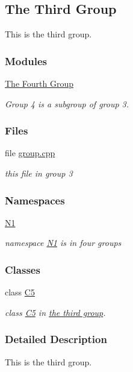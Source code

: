 \hypertarget{group__group3}{}\subsection{The Third Group}
\label{group__group3}


This is the third group.  


\subsubsection*{Modules}
\begin{DoxyCompactItemize}
\item 
\hyperlink{group__group4}{The Fourth Group}
\begin{DoxyCompactList}\small\item\em Group 4 is a subgroup of group 3. \end{DoxyCompactList}\end{DoxyCompactItemize}
\subsubsection*{Files}
\begin{DoxyCompactItemize}
\item 
file \hyperlink{group_8cpp}{group.\+cpp}
\begin{DoxyCompactList}\small\item\em this file in group 3 \end{DoxyCompactList}\end{DoxyCompactItemize}
\subsubsection*{Namespaces}
\begin{DoxyCompactItemize}
\item 
 \hyperlink{namespace_n1}{N1}
\begin{DoxyCompactList}\small\item\em namespace \hyperlink{namespace_n1}{N1} is in four groups \end{DoxyCompactList}\end{DoxyCompactItemize}
\subsubsection*{Classes}
\begin{DoxyCompactItemize}
\item 
class \hyperlink{class_c5}{C5}
\begin{DoxyCompactList}\small\item\em class \hyperlink{class_c5}{C5} in \hyperlink{group__group3}{the third group}. \end{DoxyCompactList}\end{DoxyCompactItemize}


\subsubsection{Detailed Description}
This is the third group. 

